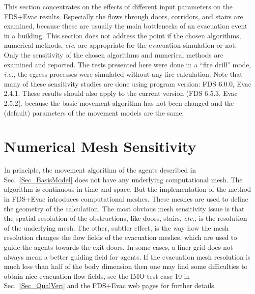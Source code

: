 \documentclass[12pt,a4paper,final,twoside]{stylevk}
\begin{document}
\noindent This section concentrates on the effects of different input
parameters on the FDS+Evac results.  Especially the flows through
doors, corridors, and stairs are examined, because these are usually
the main bottlenecks of an evacuation event in a building.  This
section does not address the point if the chosen algorithms, numerical
methods, \emph{etc}.  are appropriate for the evacuation simulation or
not.  Only the sensitivity of the chosen algorithms and numerical
methods are examined and reported.  The tests presented here were done
in a ``fire drill'' mode, \emph{i.e.}, the egress processes were
simulated without any fire calculation.  Note that many of these
sensitivity studies are done using program version: FDS 6.0.0, Evac
2.4.1.  These results should also apply to the current version (FDS
6.5.3, Evac 2.5.2), because the basic movement algorithm has not been
changed and the (default) parameters of the movement models are the
same.


\section{Numerical Mesh Sensitivity}\label{Sec_GridSensi}

\noindent In principle, the movement algorithm of the agents described
in Sec.~\ref{Sec_BasisModel} does not have any underlying
computational mesh.  The algorithm is continuous in time and space.
But the implementation of the method in FDS+Evac introduces
computational meshes.  These meshes are used to define the geometry of
the calculation.  The most obvious mesh sensitivity issue is that the
spatial resolution of the obstructions, like doors, stairs,
\emph{etc.}, is the resolution of the underlying mesh.  The other,
subtler effect, is the way how the mesh resolution changes the flow
fields of the evacuation meshes, which are used to guide the agents
towards the exit doors.  In some cases, a finer grid does not always
mean a better guiding field for agents.  If the evacuation mesh
resolution is much less than half of the body dimension then one may
find some difficulties to obtain nice evacuation flow fields, see the
IMO test case 10 in Sec.~\ref{Sec_QualVeri} and the FDS+Evac web pages
for further details.
\end{document}
